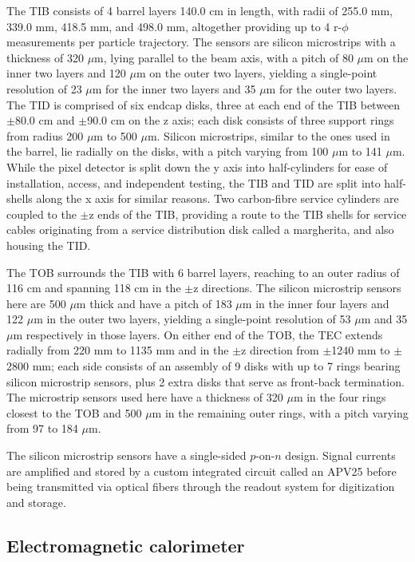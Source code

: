 The TIB consists of 4 barrel layers 140.0 cm in length, with radii of 255.0 mm, 339.0 mm, 418.5 mm, and 498.0 mm, altogether providing up to 4 r-$\phi$ measurements per particle trajectory. The sensors are silicon microstrips with a thickness of 320 $\mu$m, lying parallel to the beam axis, with a pitch of 80 $\mu$m on the inner two layers and 120 $\mu$m on the outer two layers, yielding a single-point resolution of 23 $\mu$m for the inner two layers and 35 $\mu$m for the outer two layers. The TID is comprised of six endcap disks, three at each end of the TIB between $\pm$80.0 cm and $\pm$90.0 cm on the z axis; each disk consists of three support rings from radius 200 $\mu$m to 500 $\mu$m. Silicon microstrips, similar to the ones used in the barrel, lie radially on the disks, with a pitch varying from 100 $\mu$m to 141 $\mu$m. While the pixel detector is split down the y axis into half-cylinders for ease of installation, access, and independent testing, the TIB and TID are split into half-shells along the x axis for similar reasons. Two carbon-fibre service cylinders are coupled to the $\pm$z ends of the TIB, providing a route to the TIB shells for service cables originating from a service distribution disk called a margherita, and also housing the TID.

The TOB surrounds the TIB with 6 barrel layers, reaching to an outer radius of 116 cm and spanning 118 cm in the $\pm$z directions. The silicon microstrip sensors here are 500 $\mu$m thick and have a pitch of 183 $\mu$m in the inner four layers and 122 $\mu$m in the outer two layers, yielding a single-point resolution of 53 $\mu$m and 35 $\mu$m respectively in those layers. On either end of the TOB, the TEC extends radially from 220 mm to 1135 mm and in the $\pm$z direction from $\pm$1240 mm to $\pm$2800 mm; each side consists of an assembly of 9 disks with up to 7 rings bearing silicon microstrip sensors, plus 2 extra disks that serve as front-back termination. The microstrip sensors used here have a thickness of 320 $\mu$m in the four rings closest to the TOB and 500 $\mu$m in the remaining outer rings, with a pitch varying from 97 to 184 $\mu$m.

The silicon microstrip sensors have a single-sided $p$-on-$n$ design. Signal currents are amplified and stored by a custom integrated circuit called an APV25 before being transmitted via optical fibers through the readout system for digitization and storage.

\subsection{Electromagnetic calorimeter\label{sec:cms-ecal}}

